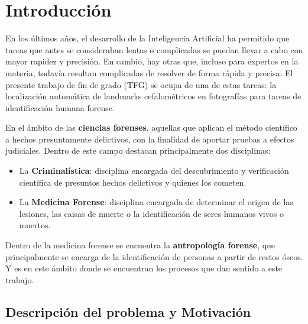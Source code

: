 
\chapter{Introducción}  \label{ch:Introduccion_informatica}

\noindent En los últimos años, el desarrollo de la Inteligencia Artificial \cite{norvig2002modern} ha permitido que tareas que antes se consideraban lentas o complicadas se puedan llevar a cabo con mayor rapidez y precisión. En cambio, hay otras que, incluso para expertos en la materia, todavía resultan complicadas de resolver de forma rápida y precisa. El presente trabajo de fin de grado (TFG) se ocupa de una de estas tareas: la localización automática de landmarks cefalométricos en fotografías para tareas de identificación humana forense. 

\medskip

\noindent En el ámbito de las \textbf{ciencias forenses}, aquellas que aplican el método científico a hechos presuntamente delictivos, con la finalidad de aportar pruebas a efectos judiciales. Dentro de este campo destacan principalmente dos disciplinas: 

\begin{itemize}
    \item La \textbf{Criminalística}: disciplina encargada del descubrimiento y verificación científica de presuntos hechos delictivos y quienes los cometen.
    \item La \textbf{Medicina Forense}: disciplina encargada de determinar el origen de las lesiones, las caisas de muerte o la identificación de seres humanos vivos o muertos.
\end{itemize}

\medskip

\noindent Dentro de la medicina forense se encuentra la \textbf{antropología forense}, que principalmente se encarga de la identificación de personas a partir de restos óseos. Y es en este ámbito donde se encuentran los procesos que dan sentido a este trabajo. 


\section{Descripción del problema y Motivación}

